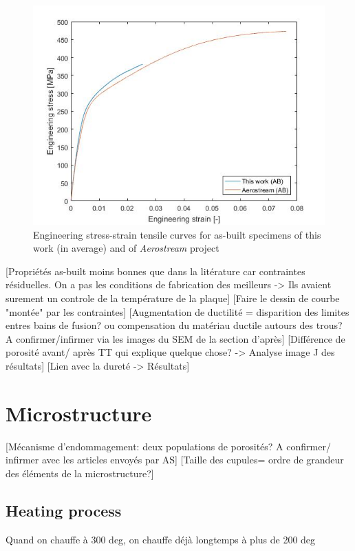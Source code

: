 \begin{figure}[ht]
	\centering
	\centerline{\includegraphics[scale=0.64]{Images/AerAB}}
	\decoRule
	\caption[Engineering stress-strain tensile curves for as-built specimens of this work (in average) and of \textit{Aerostream} project]{Engineering stress-strain tensile curves for as-built specimens of this work (in average) and of \textit{Aerostream} project}
	\label{fig:AerAB}
\end{figure}

[Propriétés as-built moins bonnes que dans la litérature car contraintes résiduelles. On a pas les conditions de fabrication des meilleurs -> Ils avaient surement un controle de la température de la plaque] 
[Faire le dessin de courbe "montée" par les contraintes]
[Augmentation de ductilité = disparition des	limites entres bains de fusion? ou compensation du matériau ductile autours des trous? A confirmer/infirmer via les images du SEM de la section d'après]
[Différence de porosité avant/ après TT qui explique quelque chose? -> Analyse image J des résultats]
[Lien avec la dureté -> Résultats]


\section{Microstructure}

[Mécanisme d'endommagement: deux populations de porosités? A confirmer/ infirmer avec les articles envoyés par AS]
[Taille des cupules= ordre de grandeur des éléments de la microstructure?] 

\subsection{Heating process}
Quand on chauffe à 300 deg, on chauffe déjà longtemps à plus de 200 deg

